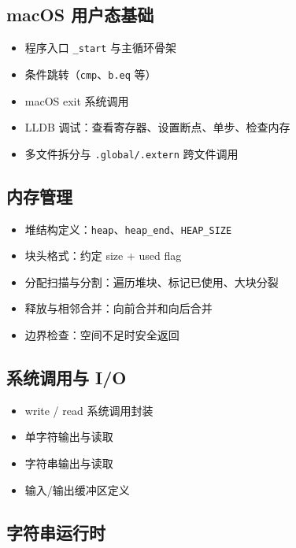 
\subsection{macOS 用户态基础}

\begin{itemize}
    \item 程序入口 \texttt{\_start} 与主循环骨架
    \item 条件跳转（\texttt{cmp}、\texttt{b.eq} 等）
    \item macOS exit 系统调用
    \item LLDB 调试：查看寄存器、设置断点、单步、检查内存
    \item 多文件拆分与 \texttt{.global/.extern} 跨文件调用
\end{itemize}

\subsection{内存管理}

\begin{itemize}
    \item 堆结构定义：\texttt{heap}、\texttt{heap\_end}、\texttt{HEAP\_SIZE}
    \item 块头格式：约定 size + used flag
    \item 分配扫描与分割：遍历堆块、标记已使用、大块分裂
    \item 释放与相邻合并：向前合并和向后合并
    \item 边界检查：空间不足时安全返回
\end{itemize}

\subsection{系统调用与 I/O}

\begin{itemize}
    \item write / read 系统调用封装
    \item 单字符输出与读取
    \item 字符串输出与读取
    \item 输入/输出缓冲区定义
\end{itemize}

\subsection{字符串运行时}

